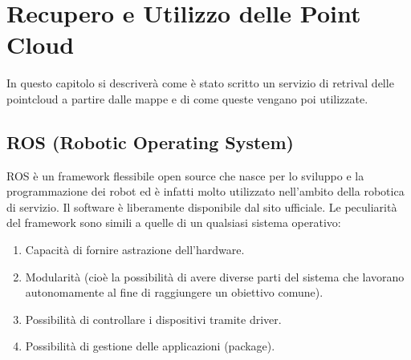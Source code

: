 \chapter{Recupero e Utilizzo delle Point Cloud}
\label{cap:ReceUsoPCL}

In questo capitolo si descriverà come è stato scritto un servizio di retrival delle pointcloud a partire dalle mappe e di come queste vengano poi utilizzate.

	\section{ROS (Robotic Operating System)}
	\label{sez:ROS}
ROS è un framework flessibile open source che nasce per lo sviluppo e la programmazione dei robot ed è infatti molto utilizzato nell'ambito della robotica di servizio. Il software è liberamente disponibile dal sito ufficiale\cite{ROS}.
Le peculiarità del framework sono simili a quelle di un qualsiasi sistema operativo:
\begin{enumerate}
 \item Capacità di fornire astrazione dell’hardware.
 \item Modularità (cioè la possibilità di avere diverse parti del sistema che lavorano autonomamente al fine di raggiungere un obiettivo comune).
 \item Possibilità di controllare i dispositivi tramite driver. 
 \item Possibilità di gestione delle applicazioni (package).
\end{enumerate}

